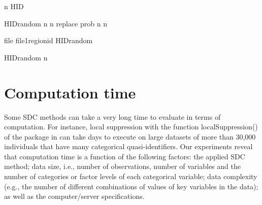 \documentclass[letterpaper,10pt,english]{sphinxmanual}
\begin{document}
\def\sphinxLiteralBlockLabel{\label{\detokenize{sdcMicro:code716}}}
%
\begin{sphinxVerbatim}[commandchars=\\\{\},numbers=left,firstnumber=1,stepnumber=1]
     n  HID 

      
     HIDrandom  n n replace   prob 
     n n 

     file  file1\PYG{p}{[}regionid HIDrandom\PYG{p}{]}

     HIDrandom  n 
\end{sphinxVerbatim}


\section{Computation time}
\label{\detokenize{sdcMicro:computation-time}}
Some SDC methods can take a very long time to evaluate in terms of
computation. For instance, local suppression with the function
localSuppression() of the  package in  can take days to
execute on large datasets of more than 30,000 individuals that have many
categorical quasi-identifiers. Our experiments reveal that computation
time is a function of the following factors: the applied SDC method;
data size, i.e., number of observations, number of variables and the
number of categories or factor levels of each categorical variable; data
complexity (e.g., the number of different combinations of values of key
variables in the data); as well as the computer/server specifications.
\end{document}
